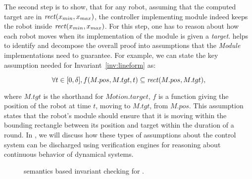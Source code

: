 The second step is to show, that for any robot, assuming that the computed target are in $\mathit{rect}(x_{min}, x_{max})$,
the controller implementing \Motion module indeed keeps the robot inside $\mathit{rect}(x_{min}, x_{max})$.
%
For this step, one has to reason about how each robot moves when its implementation of the \Motion module is given a \emph{target}.
\lgname helps to identify and decompose the overall proof into assumptions that the \emph{Module} implementations need to guarantee.
For example, we can state the key assumption needed for Invariant~\ref{inv:lineform} as:
\begin{assumption}
\label{lineform-assume}
\[
\forall t \in [0, \delta], f(M.pos, M.tgt, t) \subseteq \mathit{rect}(M.pos, M.tgt),
\]
\end{assumption}
\noindent
where $M.tgt$ is the shorthand for $Motion.target$,
$f$ is a function giving the position of the robot at time $t$, moving to $M.tgt$, from $M.pos$.
This assumption states that the robot's \Motion module should ensure that it is moving within the bounding rectangle between its position and target within the duration of a round.
In , we will discuss how these types of assumptions about the control system can be discharged using verification engines for reasoning about continuous behavior of dynamical systems.

\begin{figure}
\caption{\K semantics based invariant checking for \lgname.}
\label{fig:tools}
\end{figure}


